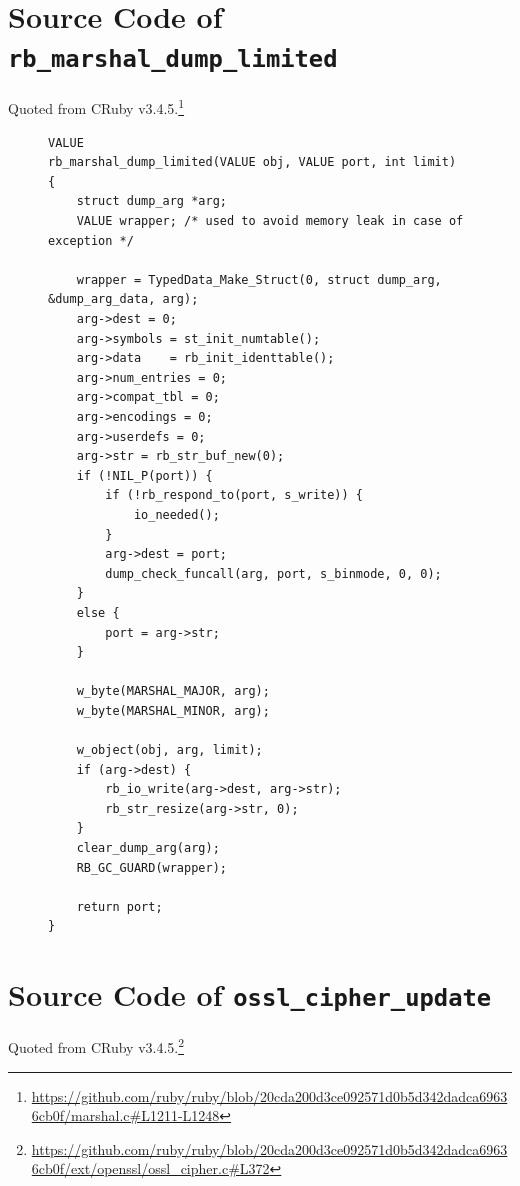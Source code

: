 \section{Source Code of \texttt{rb\_marshal\_dump\_limited}}\label{app:rb_marshal_dump_limited}
Quoted from CRuby v3.4.5.\footnote{\url{https://github.com/ruby/ruby/blob/20cda200d3ce092571d0b5d342dadca69636cb0f/marshal.c#L1211-L1248}}

\begin{figure}[tb]
\begin{lstlisting}[caption={Source code of \texttt{rb\_marshal\_dump\_limited}},label={lst:rb_marshal_dump_limited_full}]
VALUE
rb_marshal_dump_limited(VALUE obj, VALUE port, int limit)
{
    struct dump_arg *arg;
    VALUE wrapper; /* used to avoid memory leak in case of exception */

    wrapper = TypedData_Make_Struct(0, struct dump_arg, &dump_arg_data, arg);
    arg->dest = 0;
    arg->symbols = st_init_numtable();
    arg->data    = rb_init_identtable();
    arg->num_entries = 0;
    arg->compat_tbl = 0;
    arg->encodings = 0;
    arg->userdefs = 0;
    arg->str = rb_str_buf_new(0);
    if (!NIL_P(port)) {
        if (!rb_respond_to(port, s_write)) {
            io_needed();
        }
        arg->dest = port;
        dump_check_funcall(arg, port, s_binmode, 0, 0);
    }
    else {
        port = arg->str;
    }

    w_byte(MARSHAL_MAJOR, arg);
    w_byte(MARSHAL_MINOR, arg);

    w_object(obj, arg, limit);
    if (arg->dest) {
        rb_io_write(arg->dest, arg->str);
        rb_str_resize(arg->str, 0);
    }
    clear_dump_arg(arg);
    RB_GC_GUARD(wrapper);

    return port;
}
\end{lstlisting}
\end{figure}

\section{Source Code of \texttt{ossl\_cipher\_update}}\label{app:ossl_cipher_update}
Quoted from CRuby v3.4.5.\footnote{\url{https://github.com/ruby/ruby/blob/20cda200d3ce092571d0b5d342dadca69636cb0f/ext/openssl/ossl_cipher.c#L372}}


